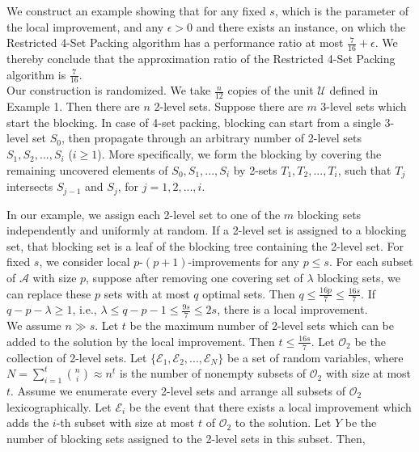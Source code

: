 \documentclass[runningheads,a4paper]{llncs}
\numberwithin{equation}{section}
\begin{document}
We construct an example showing that for any fixed $s$, which is the parameter of the local improvement, and any $\epsilon>0$ and there exists an instance, on which the Restricted 4-Set Packing algorithm has a performance ratio at most $\frac{7}{16}+\epsilon$. We thereby conclude that the approximation ratio of the Restricted 4-Set Packing algorithm is $\frac{7}{16}$. \\

Our construction is randomized. We take $\frac{n}{12}$ copies of the unit $\mathcal{U}$ defined in Example 1. Then there are $n$ 2-level sets. Suppose there are $m$ 3-level sets which start the blocking. In case of 4-set packing, blocking can start from a single 3-level set $S_0$, then propagate through an arbitrary number of 2-level sets $S_1,S_2,...,S_i$ ($i\geq 1$). More specifically, we form the blocking by covering the remaining uncovered elements of $S_0,S_1,...,S_i$ by 2-sets $T_1,T_2,...,T_i$, such that $T_j$ intersects $S_{j-1}$ and $S_{j}$, for $j=1,2,...,i$.

In our example, we assign each 2-level set to one of the $m$ blocking sets independently and uniformly at random. If a 2-level set is assigned to a blocking set, that blocking set is a leaf of the blocking tree containing the 2-level set. For fixed $s$, we consider local $p$-$(p+1)$-improvements for any $p\leq s$. For each subset of $\mathscr{A}$ with size $p$, suppose after removing one covering set of $\lambda$ blocking sets, we can replace these $p$ sets with at most $q$ optimal sets. Then $q\leq \frac{16p}{7}\leq\frac{16s}{7}$. If $q-p-\lambda\geq 1$, i.e., $\lambda\leq q-p-1\leq\frac{9s}{7}\leq 2s$, there is a local improvement. \\

We assume $n\gg s$. Let $t$ be the maximum number of 2-level sets which can be added to the solution by the local improvement. Then $t\leq \frac{16s}{7}$. Let $\mathscr{O}_2$ be the collection of 2-level sets. Let $\{\mathcal{E}_1,\mathcal{E}_2,...,\mathcal{E}_N\}$ be a set of random variables, where $N=\sum_{i=1}^t{n\choose i}\approx n^{t}$ is the number of nonempty subsets of $\mathscr{O}_2$ with size at most $t$. Assume we enumerate every 2-level sets and arrange all subsets of $\mathscr{O}_2$ lexicographically. Let $\mathcal{E}_i$ be the event that there exists a local improvement which adds the $i$-th subset with size at most $t$ of $\mathscr{O}_2$ to the solution. Let $Y$ be the number of blocking sets assigned to the 2-level sets in this subset. Then,
\end{document}
